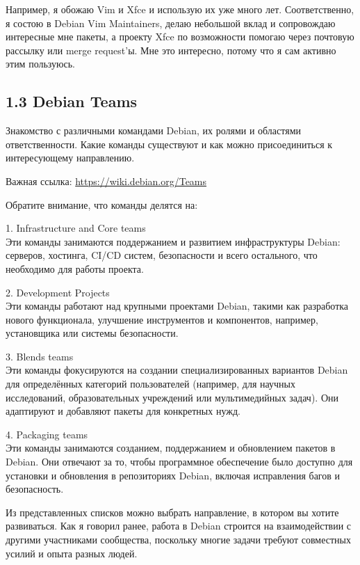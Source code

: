 Например, я обожаю Vim и Xfce и использую их уже много лет. Соответственно, я
состою в Debian Vim Maintainers, делаю небольшой вклад и сопровождаю интересные
мне пакеты, а проекту Xfce по возможности помогаю через почтовую рассылку или
merge request'ы. Мне это интересно, потому что я сам активно этим пользуюсь.

\vspace{-0.5cm}
\subsection*{\textbf{1.3 Debian Teams}}
\vspace{-0.5cm}

Знакомство с различными командами Debian, их ролями и областями ответственности.
Какие команды существуют и как можно присоединиться к интересующему направлению.

Важная ссылка: \url{https://wiki.debian.org/Teams}

Обратите внимание, что команды делятся на:

1. Infrastructure and Core teams\\
Эти команды занимаются поддержанием и развитием инфраструктуры Debian: серверов,
хостинга, CI/CD систем, безопасности и всего остального, что необходимо для
работы проекта.

2. Development Projects\\
Эти команды работают над крупными проектами Debian, такими как разработка нового
функционала, улучшение инструментов и компонентов, например, установщика или
системы безопасности.

3. Blends teams\\
Эти команды фокусируются на создании специализированных вариантов Debian для
определённых категорий пользователей (например, для научных исследований,
образовательных учреждений или мультимедийных задач). Они адаптируют и добавляют
пакеты для конкретных нужд.

4. Packaging teams\\
Эти команды занимаются созданием, поддержанием и обновлением пакетов в Debian.
Они отвечают за то, чтобы программное обеспечение было доступно для установки и
обновления в репозиториях Debian, включая исправления багов и безопасность.

Из представленных списков можно выбрать направление, в котором вы хотите
развиваться. Как я говорил ранее, работа в Debian строится на взаимодействии с
другими участниками сообщества, поскольку многие задачи требуют совместных
усилий и опыта разных людей.

